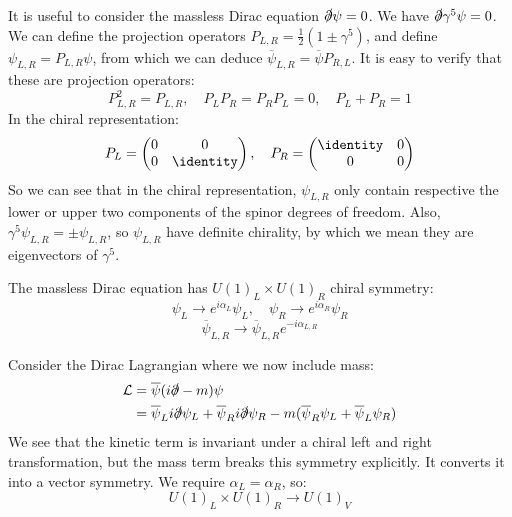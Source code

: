 \documentclass{jknotes}
\begin{document}
It is useful to consider the massless Dirac equation \(\slashed{\partial}\psi=0\). We have \(\slashed{\partial}\gamma^5\psi=0\). We can define the projection operators \(P_{L,R} =\frac{1}{2}(1\pm\gamma^5)\), and define \(\psi_{L,R} = P_{L,R}\psi\), from which we can deduce \(\overline{\psi}_{L,R}=\overline{\psi}P_{R,L}\). It is easy to verify that these are projection operators:
\begin{equation}
    P_{L,R}^2=P_{L,R}, \quad P_LP_R=P_RP_L=0, \quad P_L+P_R=1
\end{equation}
In the chiral representation:
\begin{equation}
    P_L = 
    \begin{pmatrix}
        0 & 0 \\
        0 & \identity
    \end{pmatrix}, \quad
    P_R = 
    \begin{pmatrix}
        \identity & 0 \\
        0 & 0
    \end{pmatrix}
\end{equation}
So we can see that in the chiral representation, \(\psi_{L,R}\) only contain respective the lower or upper two components of the spinor degrees of freedom. Also, \(\gamma^5\psi_{L,R}=\pm\psi_{L,R}\), so \(\psi_{L,R}\) have definite chirality, by which we mean they are eigenvectors of \(\gamma^5\).

The massless Dirac equation has \(U(1)_L\times U(1)_R\) chiral symmetry:
\begin{equation}
    \psi_L\rightarrow e^{i\alpha_L}\psi_L,\quad \psi_R\rightarrow e^{i\alpha_R}\psi_R
\end{equation}
\begin{equation}
    \overline{\psi}_{L,R} \rightarrow \overline{\psi}_{L,R} e^{-i\alpha_{L,R}}
\end{equation}

Consider the Dirac Lagrangian where we now include mass:
\begin{align}
    \mathcal{L} &= \overline{\psi}(i\slashed{\partial}-m)\psi\\
    &= \overline{\psi}_Li\slashed{\partial}\psi_L
    + \overline{\psi}_Ri\slashed{\partial}\psi_R
    - m (\overline{\psi}_R\psi_L + \overline{\psi}_L\psi_R )
\end{align}
We see that the kinetic term is invariant under a chiral left and right transformation, but the mass term breaks this symmetry explicitly. It converts it into a vector symmetry. We require \(\alpha_L=\alpha_R\), so:
\begin{equation}
    U(1)_L\times U(1)_R \rightarrow U(1)_V
\end{equation}
\end{document}
